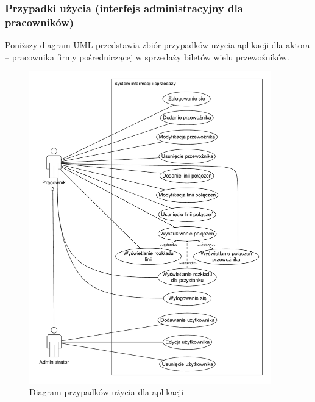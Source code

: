 \documentclass[10pt,a4paper]{article}
\begin{document}
\subsubsection{Przypadki użycia (interfejs administracyjny dla pracowników)}
Poniższy diagram UML przedstawia zbiór przypadków użycia aplikacji dla aktora -- pracownika firmy pośredniczącej w sprzedaży biletów wielu przewoźników.
\begin{figure}[H]
	\centering
	\includegraphics[width=10.5cm]{Resources/PDF/use-case.pdf}
	\caption{Diagram przypadków użycia dla aplikacji}
\end{figure}
\end{document}
